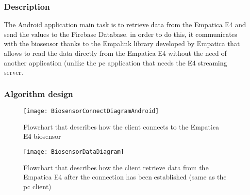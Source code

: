 \subsubsection{Description}
The Android application main task is to retrieve data from the Empatica E4 and send the values to the Firebase Database. in order to do this, it communicates with the biosensor thanks to the Empalink library developed by Empatica that allows to read the data directly from the Empatica E4 without the need of another application (unlike the pc application that needs the E4 streaming server.

\subsubsection{Algorithm design}
\begin{figure}[H]
	\centering
	\texttt{[image: BiosensorConnectDiagramAndroid]}
	\caption{Flowchart that describes how the client connects to the Empatica E4 biosensor}
\end{figure}

\begin{figure}[H]
	\centering
	\texttt{[image: BiosensorDataDiagram]}
	\caption{Flowchart that describes how the client retrieve data from the Empatica E4 after the connection has been established (same as the pc client)}
\end{figure}
